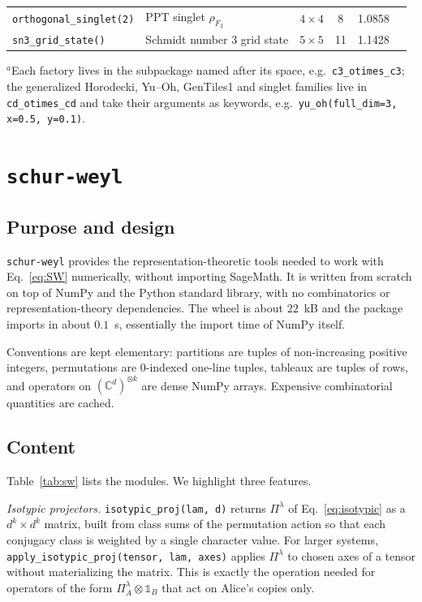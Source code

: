 \documentclass[aps,pra,twocolumn,superscriptaddress,groupedaddress]{revtex4-2}
\newcommand{\C}{\mathds{C}}
\newcommand{\one}{\mathds{1}}
\newcommand{\code}[1]{\texttt{#1}}
\begin{document}
\begin{table}[t]
\begin{ruledtabular}
\begin{tabular}{llcccl}
\code{orthogonal\_singlet(2)} & PPT singlet $\rho_{F_2}$ & $4\times4$ & 8 & 1.0858 & \cite{Pal2021} \\
\code{sn3\_grid\_state()} & Schmidt number 3 grid state & $5\times5$ & 11 & 1.1428 & \cite{Krebs2024} \\
\end{tabular}
\end{ruledtabular}
\footnotesize{$^{a}$Each factory lives in the subpackage named after its space, e.g.\ \code{c3\_otimes\_c3}; the generalized Horodecki, Yu--Oh, GenTiles1 and singlet families live in \code{cd\_otimes\_cd} and take their arguments as keywords, e.g.\ \code{yu\_oh(full\_dim=3, x=0.5, y=0.1)}.}
\end{table}

\section{\code{schur-weyl}}\label{sec:sw}

\subsection{Purpose and design}

\code{schur-weyl} provides the representation-theoretic tools needed to work
with Eq.~\eqref{eq:SW} numerically, without importing SageMath. It is written
from scratch on top of NumPy and the Python standard library, with no
combinatorics or representation-theory dependencies. The wheel is about
$22$~kB and the package imports in about $0.1$~s, essentially the import time
of NumPy itself.

Conventions are kept elementary: partitions are tuples of non-increasing
positive integers, permutations are 0-indexed one-line tuples, tableaux are
tuples of rows, and operators on $(\C^d)^{\otimes k}$ are dense NumPy arrays.
Expensive combinatorial quantities are cached.

\subsection{Content}

Table~\ref{tab:sw} lists the modules. We highlight three features.

\emph{Isotypic projectors.} \code{isotypic\_proj(lam, d)} returns
$\Pi^\lambda$ of Eq.~\eqref{eq:isotypic} as a $d^k\times d^k$ matrix, built
from class sums of the permutation action so that each conjugacy class is
weighted by a single character value. For larger systems,
\code{apply\_isotypic\_proj(tensor, lam, axes)} applies $\Pi^\lambda$ to
chosen axes of a tensor without materializing the matrix. This is exactly the
operation needed for operators of the form $\Pi^\lambda_A\otimes\one_B$ that
act on Alice's copies only.
\end{document}
